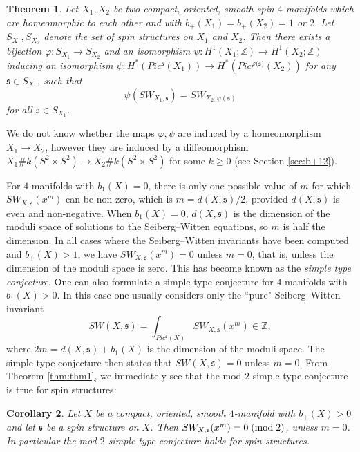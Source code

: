 \documentclass{amsart}
\newtheorem{theorem}{Theorem}[section]
\newtheorem{corollary}[theorem]{Corollary}
\theoremstyle{definition}
\theoremstyle{remark}
\numberwithin{equation}{section}
\begin{document}
\begin{theorem}\label{thm:almosttop}
Let $X_1, X_2$ be two compact, oriented, smooth spin $4$-manifolds which are homeomorphic to each other and with $b_+(X_1) = b_+(X_2) = 1$ or $2$. Let $S_{X_1}, S_{X_2}$ denote the set of spin structures on $X_1$ and $X_2$. Then there exists a bijection $\varphi : S_{X_1} \to S_{X_2}$ and an isomorphism $\psi : H^1(X_1 ; \mathbb{Z}) \to H^1(X_2 ; \mathbb{Z})$ inducing an isomorphism $\psi : H^*(Pic^{\mathfrak{s}}(X_1) ) \to H^*( Pic^{\varphi({\mathfrak{s})}}(X_2))$ for any $\mathfrak{s} \in S_{X_1}$, such that
\[
\psi( SW_{X_1 , \mathfrak{s}}) = SW_{X_2 , \varphi(\mathfrak{s})}
\]
for all $\mathfrak{s} \in S_{X_1}$.
\end{theorem}

We do not know whether the maps $\varphi, \psi$ are induced by a homeomorphism $X_1 \to X_2$, however they are induced by a diffeomorphism $X_1 \# k(S^2 \times S^2) \to X_2 \# k(S^2 \times S^2)$ for some $k \ge 0$ (see Section \ref{sec:b+12}).



For $4$-manifolds with $b_1(X) = 0$, there is only one possible value of $m$ for which $SW_{X,\mathfrak{s}}(x^m)$ can be non-zero, which is $m = d(X,\mathfrak{s})/2$, provided $d(X,\mathfrak{s})$ is even and non-negative. When $b_1(X) = 0$, $d(X,\mathfrak{s})$ is the dimension of the moduli space of solutions to the Seiberg--Witten equations, so $m$ is half the dimension. In all cases where the Seiberg--Witten invariants have been computed and $b_+(X)>1$, we have $SW_{X,\mathfrak{s}}( x^m ) = 0$ unless $m=0$, that is, unless the dimension of the moduli space is zero. This has become known as the {\em simple type conjecture}. One can also formulate a simple type conjecture for $4$-manifolds with $b_1(X) > 0$. In this case one usually considers only the ``pure" Seiberg--Witten invariant
\[
SW(X , \mathfrak{s}) = \int_{Pic^{\mathfrak{s}}(X)} SW_{X,\mathfrak{s}}( x^m ) \in \mathbb{Z},
\]
where $2m = d(X,\mathfrak{s}) + b_1(X)$ is the dimension of the moduli space. The simple type conjecture then states that $SW(X , \mathfrak{s}) = 0$ unless $m=0$. From Theorem \ref{thm:thm1}, we immediately see that the mod $2$ simple type conjecture is true for spin structures:

\begin{corollary}\label{cor:simplet}
Let $X$ be a compact, oriented, smooth $4$-manifold with $b_+(X) > 0$ and let $\mathfrak{s}$ be a spin structure on $X$. Then $SW_{X,\mathfrak{s}}(x^m) = 0 \; ({\rm mod} \; 2)$, unless $m = 0$. In particular the mod $2$ simple type conjecture holds for spin structures.
\end{corollary}
\end{document}
